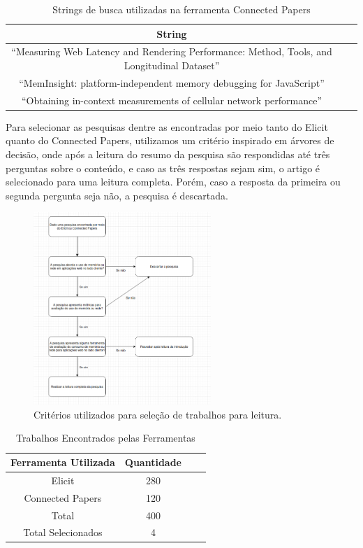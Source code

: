 \documentclass[12pt]{tcc}
\begin{document}
\begin{table}[!ht]
	\centering
	\caption{Strings de busca utilizadas na ferramenta Connected Papers}
	\begin{tabular}{c L{1.5cm} R{1.5cm}}
		\toprule
		\textbf{String} \\
		\midrule
		``Measuring Web Latency and Rendering Performance: Method, Tools, and Longitudinal Dataset''  \\
		``MemInsight: platform-independent memory debugging for JavaScript''  \\
		``Obtaining in-context measurements of cellular network performance''  \\
		\bottomrule
	\end{tabular}
	\label{tab:string-busca-connected-papers}
\end{table}

Para selecionar as pesquisas dentre as encontradas por meio tanto do Elicit quanto do Connected Papers, utilizamos um critério inspirado em árvores de decisão, onde após a leitura do resumo da pesquisa são respondidas até três perguntas sobre o conteúdo, e caso as três respostas sejam sim, o artigo é selecionado para uma leitura completa.
Porém, caso a resposta da primeira ou segunda pergunta seja não, a pesquisa é descartada.


\begin{figure}[!ht]
	\centering
	\includegraphics[width=0.6\textwidth]{figures/paper-decision-tree.png}
	\caption{Critérios utilizados para seleção de trabalhos para leitura.}
	\label{fig:fluxo-leitura}
\end{figure}

\begin{table}[!ht]
	\centering
	\caption{Trabalhos Encontrados pelas Ferramentas}
	\begin{tabular}{c  c L{1.5cm} R{1.5cm}}
		\toprule
		\textbf{Ferramenta Utilizada} & \textbf{Quantidade} \\
		\midrule
		Elicit  &  280  \\
		Connected Papers  &  120  \\
		Total  &  400  \\
		Total Selecionados  &  4  \\
		\bottomrule
	\end{tabular}
	\label{tab:trabalhos-encontrados}
\end{table}
\end{document}
